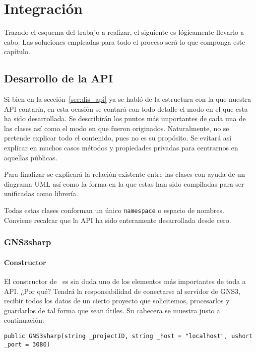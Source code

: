 \chapter{Integración}\label{chap:Integration}
Trazado el esquema del trabajo a realizar, el siguiente es lógicamente llevarlo a cabo. Las soluciones empleadas para todo el proceso será lo que componga este capítulo.

\section{Desarrollo de la API}
Si bien en la sección~\ref{sec:dis_api} ya se habló de la estructura con la que nuestra API contaría, en esta ocasión se contará con todo detalle el modo en el que esta ha sido desarrollada. Se describirán los puntos más importantes de cada una de las clases así como el modo en que fueron originados. Naturalmente, no se pretende explicar todo el contenido, pues no es su propósito. Se evitará así explicar en muchos casos métodos y propiedades privadas para centrarnos en aquellas públicas.

Para finalizar se explicará la relación existente entre las clases con ayuda de un diagrama UML así como la forma en la que estas han sido compiladas para ser unificadas como librería.

Todas estas clases conforman un único \texttt{namespace} o espacio de nombres. Conviene recalcar que la API ha sido enteramente desarrollada desde cero.

\subsection[GNS3sharp]{\href{https://github.com/aorestr/GNS3sharp/blob/master/gsn3sharp.cs}{GNS3sharp}}
\subsubsection{Constructor}
El constructor de \GNSCS~es sin duda uno de los elementos más importantes de toda a API. ¿Por qué? Tendrá la responsabilidad de conectarse al servidor de GNS3, recibir todos los datos de un cierto proyecto que solicitemos, procesarlos y guardarlos de tal forma que sean útiles. Su cabecera se muestra justo a continuación:
\begin{lstlisting}[language={[Sharp]C}, caption={Cabecera del constructor de \texttt{GNS3sharp}}, label={gnscs1}]
public GNS3sharp(string _projectID, string _host = "localhost", ushort _port = 3080)
\end{lstlisting}

